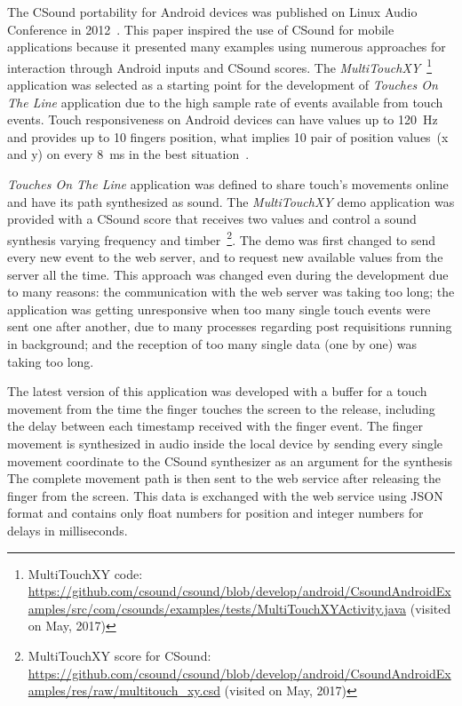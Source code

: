 The CSound portability for Android devices was published on Linux Audio Conference in 2012~\citep{Yi2012csound}.
This paper inspired the use of CSound for mobile applications because it presented many examples using numerous approaches for interaction through Android inputs and CSound scores.
The \textit{MultiTouchXY}~\footnote{MultiTouchXY code: \url{https://github.com/csound/csound/blob/develop/android/CsoundAndroidExamples/src/com/csounds/examples/tests/MultiTouchXYActivity.java} (visited on May, 2017)} application was selected as a starting point for the development of \textit{Touches On The Line} application due to the high sample rate of events available from touch events.
Touch responsiveness on Android devices can have values up to 120~Hz and provides up to 10 fingers position, what implies 10 pair of position values~(x and y) on every 8~ms in the best situation~\cite{Padre2017touchresponsiveness}.

\textit{Touches On The Line} application was defined to share touch's movements online and have its path synthesized as sound.
The \textit{MultiTouchXY} demo application was provided with a CSound score that receives two values and control a sound synthesis varying frequency and timber~\footnote{MultiTouchXY score for CSound: \url{https://github.com/csound/csound/blob/develop/android/CsoundAndroidExamples/res/raw/multitouch_xy.csd} (visited on May, 2017)}.
The demo was first changed to send every new event to the web server, and to request new available values from the server all the time.
This approach was changed even during the development due to many reasons: the communication with the web server was taking too long; 
the application was getting unresponsive when too many single touch events were sent one after another, due to many processes regarding post requisitions running in background;
and the reception of too many single data (one by one) was taking too long.

The latest version of this application was developed with a buffer for a touch movement from the time the finger touches the screen to the release, including the delay between each timestamp received with the finger event.
The finger movement is synthesized in audio inside the local device by sending every single movement coordinate to the CSound synthesizer as an argument for the synthesis
The complete movement path is then sent to the web service after releasing the finger from the screen.
This data is exchanged with the web service using JSON format and contains only float numbers for position and integer numbers for delays in milliseconds.

